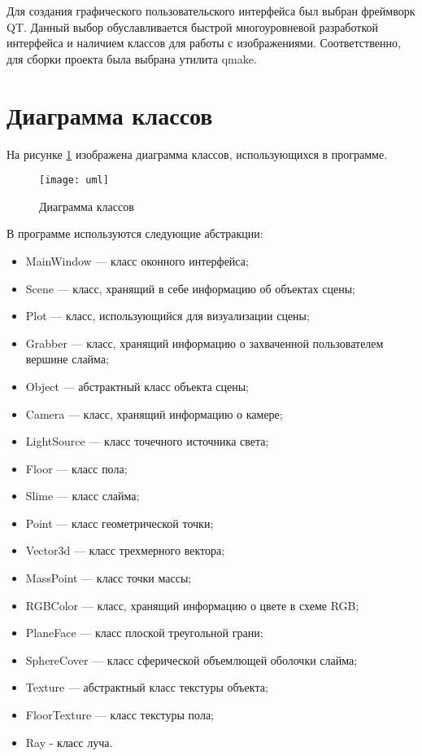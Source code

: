 Для создания графического пользовательского интерфейса был выбран фреймворк QT. Данный выбор обуславливается быстрой многоуровневой разработкой интерфейса и наличием классов для работы с изображениями. Соответственно, для сборки проекта была выбрана утилита qmake.

\section{Диаграмма классов}

На рисунке \ref{uml} изображена диаграмма классов, использующихся в программе.

\begin{figure}[h!]
	\centering
	\texttt{[image: uml]}
	\caption{Диаграмма классов}
	\label{uml}
\end{figure}

В программе используются следующие абстракции:

\begin{itemize}
	\item MainWindow --- класс оконного интерфейса;
	\item Scene --- класс, хранящий в себе информацию об объектах сцены;
	\item Plot --- класс, использующийся для визуализации сцены;
	\item Grabber --- класс, хранящий информацию о захваченной пользователем вершине слайма;
	\item Object --- абстрактный класс объекта сцены;
	\item Camera --- класс, хранящий информацию о камере;
	\item LightSource --- класс точечного источника света;
	\item Floor --- класс пола;
	\item Slime --- класс слайма;
	\item Point --- класс геометрической точки;
	\item Vector3d --- класс трехмерного вектора;
	\item MassPoint --- класс точки массы;
	\item RGBColor --- класс, хранящий информацию о цвете в схеме RGB;
	\item PlaneFace --- класс плоской треугольной грани;
	\item SphereCover --- класс сферической объемлющей оболочки слайма;
	\item Texture --- абстрактный класс текстуры объекта;
	\item FloorTexture --- класс текстуры пола;
	\item Ray - класс луча.
\end{itemize}

